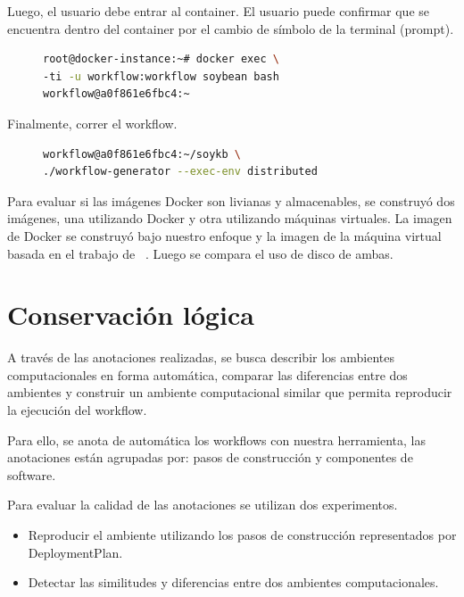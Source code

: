Luego, el usuario debe entrar al container. El usuario puede confirmar que se encuentra dentro del container por el cambio de símbolo de la terminal  (prompt).
\begin{figure}[t]
\begin{lstlisting}[caption={Entrar al ambiente computacional utilizando bash},label={lst:2},language=bash]
root@docker-instance:~# docker exec \
-ti -u workflow:workflow soybean bash
workflow@a0f861e6fbc4:~ 
\end{lstlisting}
\end{figure}

Finalmente, correr el workflow. 

\begin{figure}
\begin{lstlisting}[caption={Run the workflow},label={lst:3},language=bash]
workflow@a0f861e6fbc4:~/soykb \
./workflow-generator --exec-env distributed	
\end{lstlisting}
\end{figure}

Para evaluar si las imágenes Docker son livianas y almacenables, se construyó dos imágenes, una utilizando Docker y otra utilizando máquinas virtuales. La imagen de Docker se construyó bajo nuestro enfoque y la imagen de la máquina virtual basada en el trabajo de ~\cite{santana2017reproducibility}. Luego se compara el uso de disco de ambas.

\section{Conservación lógica}\label{s5.3}

A través de las anotaciones realizadas, se busca describir los ambientes computacionales en forma automática, comparar las diferencias entre dos ambientes y construir un ambiente computacional similar que permita reproducir la ejecución del workflow. 

Para ello, se anota de automática los workflows con nuestra herramienta, las anotaciones están agrupadas por: pasos de construcción y componentes de software. 

Para evaluar la calidad de las anotaciones se utilizan dos experimentos.

\begin{itemize}
	\item Reproducir el ambiente utilizando los pasos de construcción representados por DeploymentPlan.
	\item Detectar las similitudes y diferencias entre dos ambientes computacionales.
\end{itemize}

